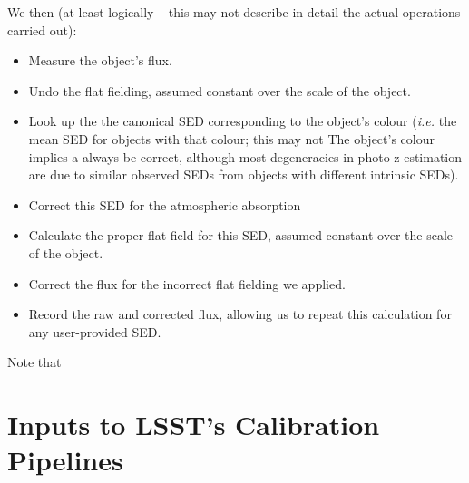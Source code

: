 \documentclass[12pt]{article}
\newcommand{\ie}{\textit{i.e.}\xspace}
\begin{document}
We then (at least logically -- this may not describe in detail the actual operations carried out):
\begin{itemize}
\item Measure the object's flux.
\item Undo the flat fielding, assumed constant over the scale of the object.
\item Look up the the canonical SED corresponding to the object's colour (\ie the mean SED for objects with
  that colour; this may not The object's colour implies a always be correct, although most degeneracies in
  photo-z estimation are due to similar observed SEDs from objects with different intrinsic SEDs).
\item Correct this SED for the atmospheric absorption
\item Calculate the proper flat field for this SED, assumed constant over the scale of the object.
\item Correct the flux for the incorrect flat fielding we applied.
\item Record the raw and corrected flux, allowing us to repeat this calculation for any user-provided SED.
\end{itemize}

Note that


\appendix

\section{Inputs to LSST's Calibration  Pipelines}
\label{sec:calibrationDatasets}
\end{document}
